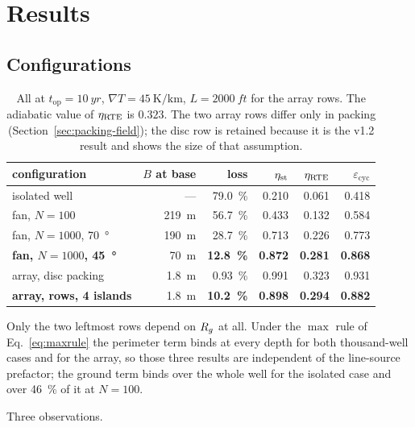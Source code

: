 \section{Results}

\subsection{Configurations}

\begin{table}[h]
\centering
\begin{tabular}{lrrrrr}
\toprule
configuration & $B$ at base & loss & $\eta_{\mathrm{st}}$ & $\eta_{\mathrm{RTE}}$
 & $\varepsilon_{\mathrm{cyc}}$ \\
\midrule
isolated well              & ---                & \SI{79.0}{\percent} & 0.210 & 0.061 & 0.418 \\
fan, $N = 100$             & \SI{219}{\metre}   & \SI{56.7}{\percent} & 0.433 & 0.132 & 0.584 \\
fan, $N = 1000$, \SI{70}{\degree} & \SI{190}{\metre} & \SI{28.7}{\percent} & 0.713 & 0.226 & 0.773 \\
\textbf{fan, $N = 1000$, \SI{45}{\degree}} & \SI{70}{\metre} & \textbf{\SI{12.8}{\percent}} & \textbf{0.872} & \textbf{0.281} & \textbf{0.868} \\
array, disc packing & \SI{1.8}{\metre}   & \SI{0.93}{\percent} & 0.991 & 0.323 & 0.931 \\
\textbf{array, rows, 4 islands} & \SI{1.8}{\metre} & \textbf{\SI{10.2}{\percent}} & \textbf{0.898} & \textbf{0.294} & \textbf{0.882} \\
\bottomrule
\end{tabular}
\caption{All at $t_{\mathrm{op}} = \SI{10}{yr}$,
$\nabla T = \SI{45}{\kelvin\per\kilo\metre}$, $L = \SI{2000}{ft}$ for the
array rows. The adiabatic value of $\eta_{\mathrm{RTE}}$ is $0.323$. The two array rows
differ only in packing (Section~\ref{sec:packing-field}); the disc row is
retained because it is the v1.2 result and shows the size of that assumption.}
\label{tab:results}
\end{table}

Only the two leftmost rows depend on $R_{g}$ at all. Under the $\max$ rule of
Eq.~\eqref{eq:maxrule} the perimeter term binds at every depth for both
thousand-well cases and for the array, so those three results are independent
of the line-source prefactor; the ground term binds over the whole well for
the isolated case and over \SI{46}{\percent} of it at $N=100$.

Three observations.

